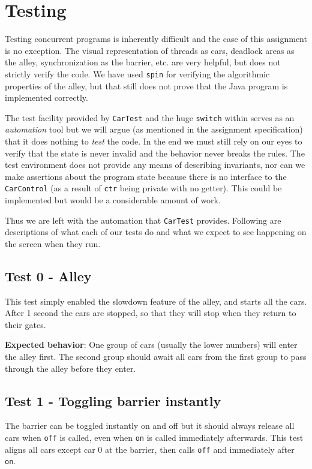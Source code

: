 \section*{Testing}

Testing concurrent programs is inherently difficult and the case of this assignment is no exception. The visual representation of threads as cars, deadlock areas as the alley, synchronization as the barrier, etc. are very helpful, but does not strictly verify the code. We have used \texttt{spin} for verifying the algorithmic properties of the alley, but that still does not prove that the Java program is implemented correctly.

The test facility provided by \texttt{CarTest} and the huge \texttt{switch} within serves as an \emph{automation} tool but we will argue (as mentioned in the assignment specification) that it does nothing to \emph{test} the code. In the end we must still rely on our eyes to verify that the state is never invalid and the behavior never breaks the rules. The test environment does not provide any means of describing invariants, nor can we make assertions about the program state because there is no interface to the \texttt{CarControl} (as a result of \texttt{ctr} being private with no getter). This could be implemented but would be a considerable amount of work.

Thus we are left with the automation that \texttt{CarTest} provides. Following are descriptions of what each of our tests do and what we expect to see happening on the screen when they run.

\subsection*{Test 0 - Alley}
This test simply enabled the slowdown feature of the alley, and starts all the cars. After 1 second the cars are stopped, so that they will stop when they return to their gates.

\textbf{Expected behavior}: One group of cars (usually the lower numbers) will enter the alley first. The second group should await all cars from the first group to pass through the alley before they enter.

\subsection*{Test 1 - Toggling barrier instantly}
The barrier can be toggled instantly on and off but it should always release all cars when \texttt{off} is called, even when \texttt{on} is called immediately afterwards. This test aligns all cars except car 0 at the barrier, then calls \texttt{off} and immediately after \texttt{on}.

